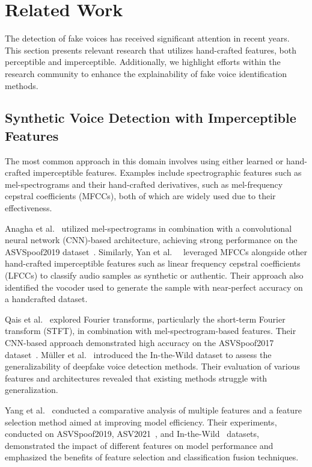 \documentclass{article}
\begin{document}
\section{Related Work} \label{sec:related}

The detection of fake voices has received significant attention in recent years. This section presents relevant research that utilizes hand-crafted features, both perceptible and imperceptible. Additionally, we highlight efforts within the research community to enhance the explainability of fake voice identification methods.

\subsection{Synthetic Voice Detection with Imperceptible Features}

The most common approach in this domain involves using either learned or hand-crafted imperceptible features. Examples include spectrographic features such as mel-spectrograms and their hand-crafted derivatives, such as mel-frequency cepstral coefficients (MFCCs), both of which are widely used due to their effectiveness.

Anagha et al.~\cite{anagha_audio_2023} utilized mel-spectrograms in combination with a convolutional neural network (CNN)-based architecture, achieving strong performance on the ASVSpoof2019 dataset~\cite{wang_asvspoof_2020}. Similarly, Yan et al.~~\cite{yan_initial_2022} leveraged MFCCs alongside other hand-crafted imperceptible features such as linear frequency cepstral coefficients (LFCCs) to classify audio samples as synthetic or authentic. Their approach also identified the vocoder used to generate the sample with near-perfect accuracy on a handcrafted dataset.

\sloppy
Qais et al.~\cite{qais_deepfake_2022} explored Fourier transforms, particularly the short-term Fourier transform (STFT), in combination with mel-spectrogram-based features. Their CNN-based approach demonstrated high accuracy on the ASVSpoof2017 dataset~\cite{delgado_asvspoof_2018}. Müller et al.~\cite{muller_does_2022} introduced the In-the-Wild dataset to assess the generalizability of deepfake voice detection methods. Their evaluation of various features and architectures revealed that existing methods struggle with generalization.

Yang et al.~\cite{yang_robust_2024} conducted a comparative analysis of multiple features and a feature selection method aimed at improving model efficiency. Their experiments, conducted on ASVSpoof2019\cite{wang_asvspoof_2020}, ASV2021~\cite{liu_asvspoof_2023}, and In-the-Wild~\cite{muller_does_2022} datasets, demonstrated the impact of different features on model performance and emphasized the benefits of feature selection and classification fusion techniques.
\end{document}
